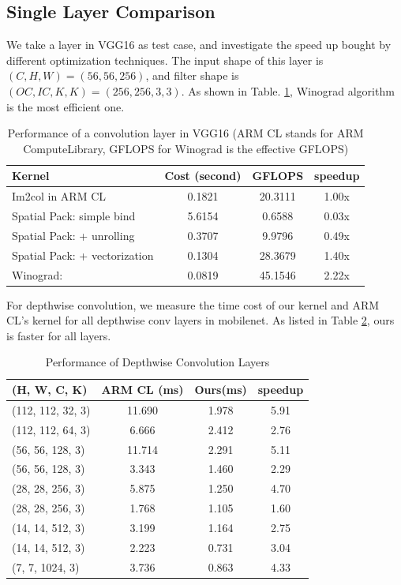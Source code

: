 \documentclass[sigplan]{acmart}
\begin{document}
\subsection {Single Layer Comparison}
We take a layer in VGG16 as test case, and investigate the speed up bought by different optimization techniques.
The input shape of this layer is $(C, H, W) = (56, 56, 256)$, and filter shape is $(OC, IC, K, K )= (256, 256, 3, 3)$. As shown in Table. \ref{table:conv2d}, Winograd algorithm is the most efficient one.
\begin{table}[h]
\centering
\begin{tabular}{lccc}
\hline
Kernel & Cost (second) & GFLOPS & speedup \\
\hline
Im2col in ARM CL	& 0.1821 & 20.3111 & 1.00x \\
Spatial Pack: simple bind		& 5.6154	& 0.6588	& 0.03x \\
Spatial Pack: + unrolling		& 0.3707	& 9.9796	& 0.49x \\ 
Spatial Pack: + vectorization		& 0.1304	& 28.3679 & 1.40x \\
Winograd: 		& 0.0819 & 45.1546 & 2.22x \\
\hline
\end{tabular}
\caption{Performance of a convolution layer in VGG16 (ARM CL stands for ARM ComputeLibrary, GFLOPS for Winograd is the effective GFLOPS)}
\label{table:conv2d}
\end{table}

For depthwise convolution, we measure the time cost of our kernel and ARM CL's kernel for all depthwise  conv layers in mobilenet. 
As listed in Table \ref{table:depth}, ours is faster for all layers.

\begin{table}[h]
\centering
\begin{tabular}{lccc}
\hline
(H, W, C, K) & ARM CL (ms) & Ours(ms) & speedup \\
\hline
(112, 112, 32,   3) & 11.690 & 1.978 & 5.91 \\
(112, 112, 64,   3) & 6.666  & 2.412 & 2.76 \\
(56,  56,  128,  3) & 11.714 & 2.291 & 5.11 \\
(56,  56,  128,  3) & 3.343  & 1.460 & 2.29 \\
(28,  28,  256,  3) & 5.875  & 1.250 & 4.70 \\
(28,  28,  256,  3) & 1.768  & 1.105 & 1.60 \\
(14,  14,  512,  3) & 3.199  & 1.164 & 2.75 \\
(14,  14,  512,  3) & 2.223  & 0.731 & 3.04 \\
(7,   7,   1024, 3) & 3.736  & 0.863 & 4.33 \\
\hline
\end{tabular}
\caption{Performance of Depthwise Convolution Layers}
\label{table:depth}
\end{table}
\end{document}
